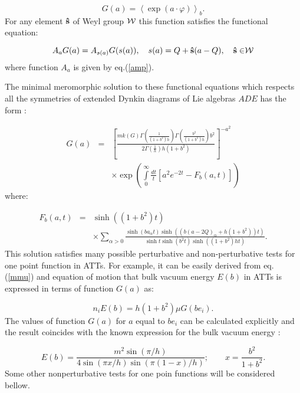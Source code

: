 \documentclass[a4paper,12pt]{article}
\begin{document}
\begin{equation}
G(a)=\left\langle \exp (a\cdot \varphi )\right\rangle _b .  \label{g}
\end{equation}
For any element ${\bf \hat{s}}$ of Weyl group ${\cal W}$ this function
satisfies the functional equation:

\begin{equation}
A_aG(a)=A_{s(a)}G(s(a)),\quad s(a)=Q+{\bf \hat{s}}(a-Q),\quad {\bf \hat{s}
\in }{\cal W}  \label{fe}
\end{equation}
where function $A_a$ is given by eq.(\ref{amp}).

The minimal meromorphic solution to these functional equations 
which respects all
the symmetries of extended Dynkin diagrams of Lie algebras $ADE$ has the
form \cite{VFA}:

\begin{eqnarray}
G(a) & =  & 
   \left[ \frac{mk(G)\Gamma \left( \frac 1{(1+b^2)h}\right) 
\Gamma \left(\frac{b^2}{(1+b^2)h}\right)b^2 }
{2\Gamma \left( \frac 1h\right)h(1+b^2) }\right]
^{-a^2}   \nonumber \\
  & & \times\exp \left( \int\limits_0^\infty \frac{dt}t[a^2e^{-2t}-F_b(a,t)]
\right)  \label{vev}
\end{eqnarray}
where:

\begin{eqnarray}
F_b(a,t)&=&\sinh ((1+b^2)t)
\nonumber \\
&&\times
\sum_{\alpha >0}\frac{\sinh (ba_\alpha t)\sinh
((b(a-2Q)_\alpha +h(1+b^2))t)}{\sinh t\sinh (b^2t)\sinh ((1+b^2)ht)}.
\label{fb}
\end{eqnarray}
This solution satisfies many possible perturbative and non-perturbative
tests for one point function in ATTs. For example, it can be easily derived 
from eq.(\ref{mmu}) and equation of motion that bulk vacuum energy $E(b)$ in 
ATTs is expressed in terms of function $G(a)$ as:

\begin{equation}
n_i E(b)=h(1+b^2)\mu G(be_i).  \label{ebulk}
\end{equation}
The values of function $G(a)$ for $a$ equal to $be_i$ can be calculated 
explicitly and the result coincides with the known expression for the bulk 
vacuum energy \cite{DdV}:

\begin{equation}
E(b)=\frac{m^2 \sin(\pi/h)}{4\sin(\pi x/h)\sin(\pi (1-x)/h)};  \qquad 
x=\frac{b^2}{1+b^2}.  \label{ebul}
\end{equation}
Some other nonperturbative tests for one poin functions will be considered 
bellow. 
\end{document}
